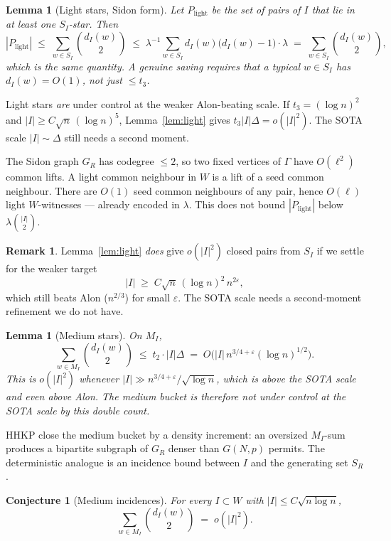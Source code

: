 \documentclass[11pt]{article}
\newtheorem{lemma}[theorem]{Lemma}
\newtheorem{conjecture}[theorem]{Conjecture}
\theoremstyle{definition}
\newtheorem{remark}[theorem]{Remark}
\newcommand{\bin}[2]{\binom{#1}{#2}}
\newcommand{\eps}{\varepsilon}
\begin{document}
\begin{lemma}[Light stars, Sidon form]\label{lem:light-sidon}
Let $P_{\mathrm{light}}$ be the set of pairs of $I$ that lie in at least one $S_I$-star.
Then
\[
  |P_{\mathrm{light}}|
  \;\le\;
  \sum_{w\in S_I}\bin{d_I(w)}{2}
  \;\le\;
  \lambda^{-1}\sum_{w\in S_I}d_I(w)\bigl(d_I(w)-1\bigr)\cdot\lambda
  \;=\;
  \sum_{w\in S_I}\bin{d_I(w)}{2},
\]
which is the same quantity.
A genuine saving requires that a typical $w\in S_I$ has $d_I(w)=O(1)$, not just $\le t_{3}$.
\end{lemma}

Light stars \emph{are} under control at the weaker Alon-beating scale.
If $t_{3}=(\log n)^{2}$ and $|I|\ge C\sqrt{n}\,(\log n)^{5}$, Lemma~\ref{lem:light} gives
$t_{3}|I|\Delta=o(|I|^{2})$.
The SOTA scale $|I|\sim\Delta$ still needs a second moment.

The Sidon graph $G_R$ has codegree $\le 2$, so two fixed vertices of $\Gamma$ have $O(\ell^{2})$ common lifts.
A light common neighbour in $W$ is a lift of a seed common neighbour.
There are $O(1)$ seed common neighbours of any pair, hence $O(\ell)$ light $W$-witnesses --- already encoded in $\lambda$.
This does not bound $|P_{\mathrm{light}}|$ below $\lambda\bin{|I|}{2}$.

\begin{remark}
Lemma~\ref{lem:light} \emph{does} give $o(|I|^{2})$ closed pairs from $S_I$ if we settle for the weaker target
\[
  |I|\;\ge\;C\sqrt{n}\,(\log n)^{2}\,n^{2\eps},
\]
which still beats Alon ($n^{2/3}$) for small $\eps$.
The SOTA scale needs a second-moment refinement we do not have.
\end{remark}

\begin{lemma}[Medium stars]\label{lem:med}
On $M_I$,
\[
  \sum_{w\in M_I}\bin{d_I(w)}{2}
  \;\le\;
  t_{2}\cdot|I|\Delta
  \;=\;
  O\bigl(|I|\,n^{3/4+\eps}(\log n)^{1/2}\bigr).
\]
This is $o(|I|^{2})$ whenever $|I|\gg n^{3/4+\eps}/\sqrt{\log n}$, which is above the SOTA scale and even above Alon.
The medium bucket is therefore \emph{not} under control at the SOTA scale by this double count.
\end{lemma}

HHKP close the medium bucket by a density increment: an oversized $M_I$-sum produces a bipartite subgraph of $G_R$ denser than $G(N,p)$ permits.
The deterministic analogue is an incidence bound between $I$ and the generating set $S_R$.

\begin{conjecture}[Medium incidences]\label{conj:med}
For every $I\subset W$ with $|I|\le C\sqrt{n\log n}$,
\[
  \sum_{w\in M_I}\bin{d_I(w)}{2}
  \;=\;
  o(|I|^{2}).
\]
\end{conjecture}
\end{document}
